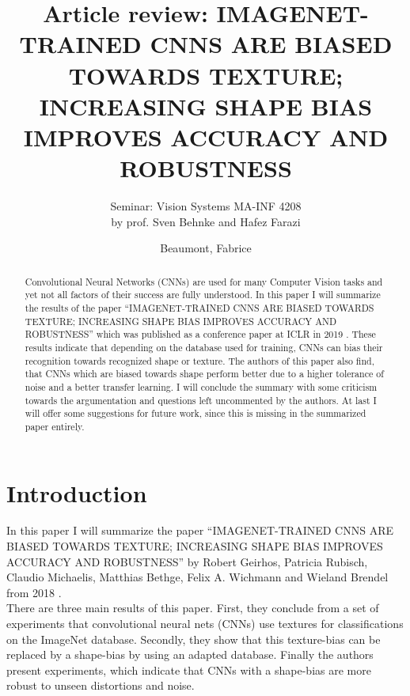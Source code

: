\documentclass[runningheads,a4paper]{llncs}
\begin{document}
%
\frontmatter          %
%
\pagestyle{headings}  %
%
\mainmatter              %
%
\title{Article review: IMAGENET-TRAINED CNNS ARE BIASED TOWARDS TEXTURE; INCREASING SHAPE BIAS IMPROVES ACCURACY AND ROBUSTNESS}
\subtitle{Seminar: Vision Systems MA-INF 4208 \\by prof. Sven Behnke and Hafez Farazi}
%
%
\author{Beaumont, Fabrice}
%

\maketitle              %

\begin{abstract}
	Convolutional Neural Networks (CNNs) are used for many Computer Vision tasks and yet not all factors of their success are fully understood. In this paper I will summarize the results of the paper ``IMAGENET-TRAINED CNNS ARE BIASED TOWARDS TEXTURE; INCREASING SHAPE BIAS IMPROVES ACCURACY AND ROBUSTNESS'' which was published as a conference paper at ICLR in 2019 \citep{geirhos2018imagenet}. These results indicate that depending on the database used for training, CNNs can bias their recognition towards recognized shape or texture. The authors of this paper also find, that CNNs which are biased towards shape perform better due to a higher tolerance of noise and a better transfer learning. I will conclude the summary with some criticism towards the argumentation and questions left uncommented by the authors. At last I will offer some suggestions for future work, since this is missing in the summarized paper entirely.
\end{abstract}

\section{Introduction}

In this paper I will summarize the paper ``IMAGENET-TRAINED CNNS ARE BIASED TOWARDS TEXTURE; INCREASING SHAPE BIAS IMPROVES ACCURACY AND ROBUSTNESS'' by Robert Geirhos, Patricia Rubisch, Claudio Michaelis, Matthias Bethge, Felix A. Wichmann and Wieland Brendel from 2018 \citep{geirhos2018imagenet}.\\
There are three main results of this paper. 
First, they conclude from a set of experiments that convolutional neural nets (CNNs) use textures for classifications on the ImageNet database. Secondly, they show that this texture-bias can be replaced by a shape-bias by using an adapted database. Finally the authors present experiments, which indicate that CNNs with a shape-bias are more robust to unseen distortions and noise.\\
\end{document}
